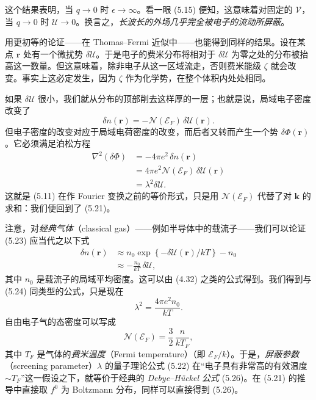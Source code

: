 这个结果表明，当 $q\to 0$ 时 $\epsilon\to\infty$。看一眼 (5.15) 便知，这意味着对固定的 $\mathcal{V}$，当 $q\to 0$ 时 $\mathcal{U}\to 0$。换言之，\emph{长波长的外场几乎完全被电子的流动所屏蔽}。

用更初等的论证——在 Thomas--Fermi 近似中——也能得到同样的结果。设在某点 $\mathbf{r}$ 处有一个微扰势 $\delta\mathcal{U}$。于是电子的费米分布将相对于 $\delta\mathcal{U}$ 为零之处的分布被抬高这一数量。但这意味着，除非电子从这一区域流走，否则费米能级 $\zeta$ 就会改变。事实上这必定发生，因为 $\zeta$ 作为化学势，在整个体积内处处相同。


如果 $\delta\mathcal{U}$ 很小，我们就从分布的顶部削去这样厚的一层；也就是说，局域电子密度改变了
\begin{equation*}
\delta n(\mathbf{r})=-\mathcal{N}(\mathcal{E}_{F})\,\delta\mathcal{U}(\mathbf{r}).
\tag{5.23}
\end{equation*}
但电子密度的改变对应于局域电荷密度的改变，而后者又转而产生一个势 $\delta\Phi(\mathbf{r})$。它必须满足泊松方程
\begin{align*}
\nabla^{2}(\delta\Phi)&=-4\pi e^{2}\,\delta n(\mathbf{r})\\
&=4\pi e^{2}\mathcal{N}(\mathcal{E}_{F})\,\delta\mathcal{U}(\mathbf{r})\\
&=\lambda^{2}\delta\mathcal{U}.
\tag{5.24}
\end{align*}
这就是 (5.11) 在作 Fourier 变换之前的等价形式，只是用 $\mathcal{N}(\mathcal{E}_{F})$ 代替了对 $\mathbf{k}$ 的求和：我们便回到了 (5.21)。

注意，对\emph{经典气体}（classical gas）——例如半导体中的载流子——我们可以论证 (5.23) 应当代之以下式
\begin{align*}
\delta n(\mathbf{r})&\approx n_{0}\exp\left\{-\delta\mathcal{U}(\mathbf{r})/kT\right\}-n_{0}\\
&\approx-\frac{n_{0}}{kT}\,\delta\mathcal{U},
\tag{5.25}
\end{align*}
其中 $n_{0}$ 是载流子的局域平均密度。这可以由 (4.32) 之类的公式得到。我们得到与 (5.24) 同类型的公式，只是现在
\begin{equation*}
\lambda^{2}=\frac{4\pi e^{2}n_{0}}{kT}.
\tag{5.26}
\end{equation*}
自由电子气的态密度可以写成
\begin{equation*}
\mathcal{N}(\mathcal{E}_{F})=\frac{3}{2}\,\frac{n}{kT_{F}},
\tag{5.27}
\end{equation*}
其中 $T_{F}$ 是气体的\emph{费米温度}（Fermi temperature）（即 $\mathcal{E}_{F}/k$）。于是，\emph{屏蔽参数}（screening parameter）$\lambda$ 的量子理论公式 (5.22) 在“电子具有非常高的有效温度 $\sim T_{F}$”这一假设之下，就等价于经典的 \emph{Debye--Hückel 公式} (5.26)。在 (5.21) 的推导中直接取 $f^{0}$ 为 Boltzmann 分布，同样可以直接得到 (5.26)。

